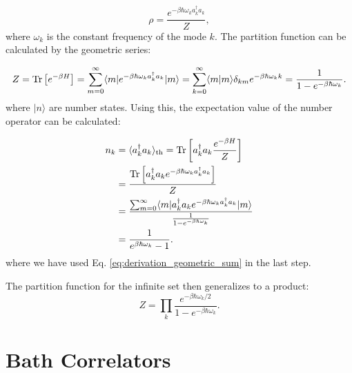 \begin{equation} \label{eq:single_mode_density_matrix}
\rho = \frac{e^{-\beta \hbar \omega_k a_k^{\dagger} a_k}}{Z},
\end{equation}
where \( \omega_k \) is the constant frequency of the mode \( k \).
The partition function can be calculated by the geometric series:

\begin{equation} \label{eq:partition_function}
    Z = \Tr\left[e^{-\beta H}\right] = \sum_{m=0}^{\infty} \langle m | e^{-\beta \hbar \omega_k a_k^{\dagger} a_k} | m \rangle
    = \sum_{k=0}^{\infty} \langle m | m \rangle \delta_{km} e^{-\beta \hbar \omega_k k} \\
    = \frac{1}{1 - e^{-\beta \hbar \omega_k}}. %
\end{equation}
where \(|n\rangle\) are number states. 
Using this, the expectation value of the number operator can be calculated:

\begin{align} \label{eq:expectation_number_operator}
n_k &= \langle a_k^{\dagger} a_k \rangle_{\text{th}} = \mathrm{Tr} \left[ a_k^{\dagger} a_k \frac{e^{-\beta H}}{Z} \right] \\
    &= \frac{\mathrm{Tr} \left[ a_k^{\dagger} a_k e^{-\beta \hbar \omega_k a_k^{\dagger} a_k} \right]}{Z} \\
    &= \frac{\sum_{m=0}^{\infty} \langle m|a_k^{\dagger} a_k e^{-\beta \hbar \omega_k a_k^{\dagger} a_k}|m \rangle}{\frac{1}{1 - e^{-\beta \hbar \omega_k}}} \\
    &= \frac{1}{e^{\beta \hbar \omega_k} - 1}.
\end{align}
where we have used Eq. \eqref{eq:derivation_geometric_sum} in the last step.

The partition function for the infinite set then generalizes to a product:
\begin{equation} \label{eq:generalized_partition_function}
Z = \prod_k \frac{e^{-\beta \hbar \omega_k / 2}}{1 - e^{-\beta \hbar \omega_k}}.
\end{equation}

\section{Bath Correlators}
\label{sec:bath_corr_trans_rates}

